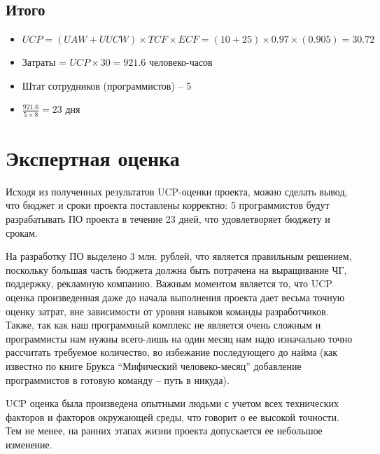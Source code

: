 \documentclass[a4paper,8pt]{article}
\begin{document}
\subsection*{Итого}


    \begin{itemize}
        \item $UCP = (UAW + UUCW) \times TCF \times ECF = (10 + 25) \times 0.97 \times (0.905) = 30.72$
        \item Затраты = $UCP \times 30 = 921.6$ человеко-часов
        \item Штат сотрудников (программистов) -- 5
        \item $\frac{921.6}{5 \times 8} = 23$ дня
    \end{itemize}

\section*{Экспертная оценка}

    Исходя из полученных результатов UCP-оценки проекта, можно сделать вывод, что бюджет и сроки проекта поставлены корректно: 5 программистов будут разрабатывать ПО проекта в течение 23 дней, что удовлетворяет бюджету и срокам.

    На разработку ПО выделено 3 млн. рублей, что является правильным решением, поскольку большая часть бюджета должна быть потрачена на выращивание ЧГ, поддержку, рекламную компанию. Важным моментом является то, что UCP оценка произведенная даже до начала выполнения проекта дает весьма точную оценку затрат, вне зависимости от уровня навыков команды разработчиков. Также, так как наш программный комплекс не является очень сложным и программисты нам нужны всего-лишь на один месяц нам надо изначально точно рассчитать требуемое количество, во избежание последующего до найма (как известно по книге Брукса ``Мифический человеко-месяц'' добавление программистов в готовую команду -- путь в никуда). 

    UCP оценка была произведена опытными людьми с учетом всех технических факторов и факторов окружающей среды, что говорит о ее высокой точности. Тем не менее, на ранних этапах жизни проекта допускается ее небольшое изменение.
\end{document}
